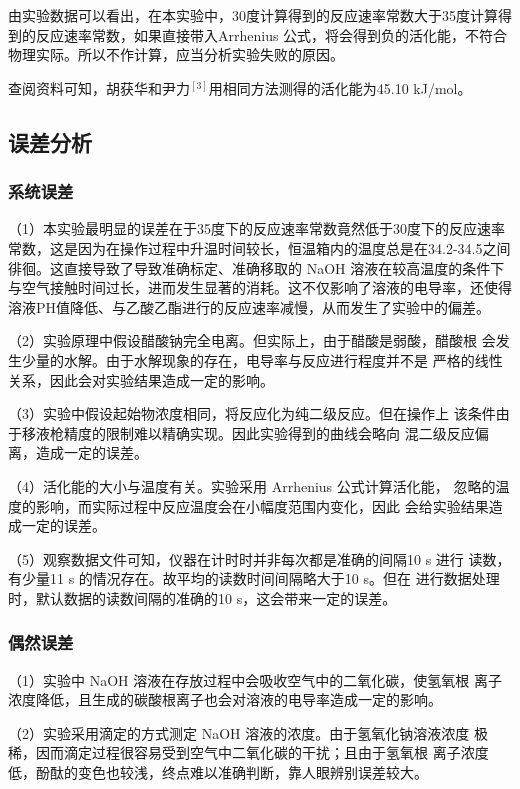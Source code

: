 \documentclass[12pt]{ctexart}
\numberwithin{equation}{section}
\begin{document}
由实验数据可以看出，在本实验中，30度计算得到的反应速率常数大于35度计算得到的反应速率常数，如果直接带入Arrhenius 公式，将会得到负的活化能，不符合物理实际。所以不作计算，应当分析实验失败的原因。

查阅资料可知，胡获华和尹力$^{[3]}$用相同方法测得的活化能为45.10 kJ/mol。

\subsection{误差分析}
\subsubsection{系统误差}

（1）本实验最明显的误差在于35度下的反应速率常数竟然低于30度下的反应速率常数，这是因为在操作过程中升温时间较长，恒温箱内的温度总是在34.2-34.5之间徘徊。这直接导致了导致准确标定、准确移取的 NaOH 溶液在较高温度的条件下与空气接触时间过长，进而发生显著的消耗。这不仅影响了溶液的电导率，还使得溶液PH值降低、与乙酸乙酯进行的反应速率减慢，从而发生了实验中的偏差。

（2）实验原理中假设醋酸钠完全电离。但实际上，由于醋酸是弱酸，醋酸根
会发生少量的水解。由于水解现象的存在，电导率与反应进行程度并不是
严格的线性关系，因此会对实验结果造成一定的影响。

（3）实验中假设起始物浓度相同，将反应化为纯二级反应。但在操作上
该条件由于移液枪精度的限制难以精确实现。因此实验得到的曲线会略向
混二级反应偏离，造成一定的误差。

（4）活化能的大小与温度有关。实验采用 Arrhenius 公式计算活化能，
忽略的温度的影响，而实际过程中反应温度会在小幅度范围内变化，因此
会给实验结果造成一定的误差。

（5）观察数据文件可知，仪器在计时时并非每次都是准确的间隔10 s 进行
读数，有少量11 s 的情况存在。故平均的读数时间间隔略大于10 s。但在
进行数据处理时，默认数据的读数间隔的准确的10 s，这会带来一定的误差。

\subsubsection{偶然误差}

（1）实验中 NaOH 溶液在存放过程中会吸收空气中的二氧化碳，使氢氧根
离子浓度降低，且生成的碳酸根离子也会对溶液的电导率造成一定的影响。

（2）实验采用滴定的方式测定 NaOH 溶液的浓度。由于氢氧化钠溶液浓度
极稀，因而滴定过程很容易受到空气中二氧化碳的干扰；且由于氢氧根
离子浓度低，酚酞的变色也较浅，终点难以准确判断，靠人眼辨别误差较大。
\end{document}

